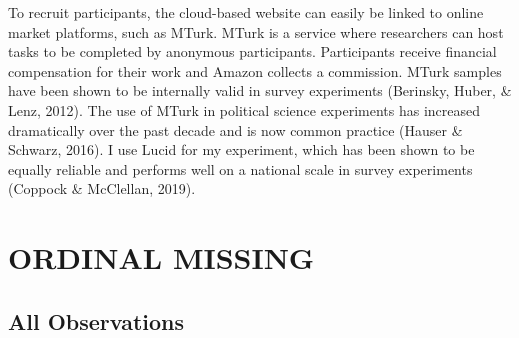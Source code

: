 \documentclass[12pt,econ]{sources/authesis}
\begin{document}
To recruit participants, the cloud-based website can easily be linked to online market platforms, such as MTurk. MTurk is a service where researchers can host tasks to be completed by anonymous participants. Participants receive financial compensation for their work and Amazon collects a commission. MTurk samples have been shown to be internally valid in survey experiments (Berinsky, Huber, \& Lenz, 2012). The use of MTurk in political science experiments has increased dramatically over the past decade and is now common practice (Hauser \& Schwarz, 2016). I use Lucid for my experiment, which has been shown to be equally reliable and performs well on a national scale in survey experiments (Coppock \& McClellan, 2019).

\hypertarget{app-ordmiss}{%
\chapter{ORDINAL MISSING}\label{app-ordmiss}}

\hypertarget{app-ordmiss-allObs}{%
\section{All Observations}\label{app-ordmiss-allObs}}
\end{document}
